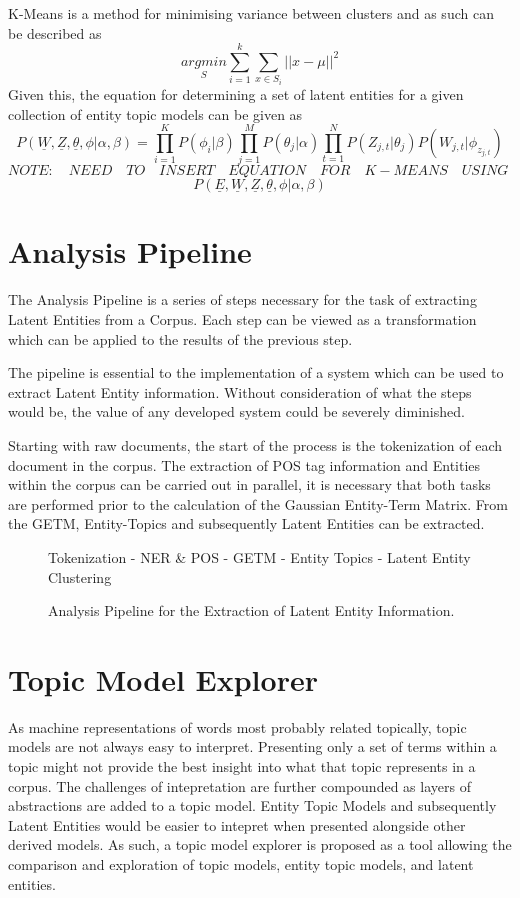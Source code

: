 \documentclass[10pt]{report}
\begin{document}
K-Means is a method for minimising variance between clusters and as such can be described as
\[
  \underset{S}{argmin} \sum^{k}_{i=1}\sum^{}_{x\in S_i}||x-\mu||^2
\]
Given this, the equation for determining a set of latent entities for a given collection of entity topic models can be given as
\[
  P(\underline{W},\underline{Z},\underline{\theta},\phi|\alpha,\beta) = \prod^{K}_{i=1} P(\phi_i|\beta) \prod^{M}_{j=1} P(\theta_j|\alpha)\prod^{N}_{t=1} P(Z_{j,t} | \theta_j)P(W_{j,t} | \phi_{z_{j,t}})
\]
\[
  NOTE:\quad NEED\quad TO\quad INSERT\quad EQUATION\quad FOR\quad K-MEANS\quad USING\quad
\]
\[
  P(\underline{E},\underline{W},\underline{Z}, \underline{\theta},\phi | \alpha, \beta)
\]

\section{Analysis Pipeline}
The Analysis Pipeline is a series of steps necessary for the task of extracting Latent Entities from a Corpus. Each step can be viewed as a transformation which can be applied to the results of the previous step.

The pipeline is essential to the implementation of a system which can be used to extract Latent Entity information. Without consideration of what the steps would be, the value of any developed system could be severely diminished.

Starting with raw documents, the start of the process is the tokenization of each document in the corpus. The extraction of POS tag information and Entities within the corpus can be carried out in parallel, it is necessary that both tasks are performed prior to the calculation of the Gaussian Entity-Term Matrix. From the GETM, Entity-Topics and subsequently Latent Entities can be extracted.

\begin{figure}[h!]

  \centering Tokenization - NER \& POS - GETM - Entity Topics - Latent Entity Clustering  
  \caption{Analysis Pipeline for the Extraction of Latent Entity Information.}
\end{figure}

\section{Topic Model Explorer}

As machine representations of words most probably related topically, topic models are not always easy to interpret. Presenting only a set of terms within a topic might not provide the best insight into what that topic represents in a corpus. The challenges of intepretation are further compounded as layers of abstractions are added to a topic model. Entity Topic Models and subsequently Latent Entities would be easier to intepret when presented alongside other derived models. As such, a topic model explorer is proposed as a tool allowing the comparison and exploration of topic models, entity topic models, and latent entities.
\end{document}
